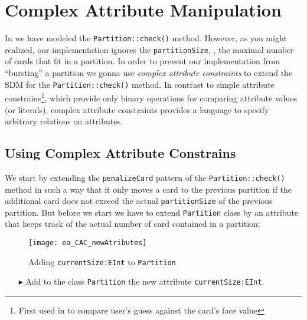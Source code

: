 \newpage
\section{Complex Attribute Manipulation}
\genHeader
In  we have modeled the \texttt{Partition::check()} method.
However, as you might realized, our implementation ignores the \texttt{partitionSize}, \idest, the maximal number of cards that fit in a partition.
In order to prevent our implementation from \enquote{bursting} a partition we gonna use \emph{complex attribute constraints} to extend the SDM for the \texttt{Partition::check()} method. 
In contrast to simple attribute constrains\footnote{First used in  to compare user’s guess against the card's face value}, which provide only binary operations for comparing attribute values (or literals), complex attribute constraints provides a language to specify arbitrary relations on attributes.

\subsection{Using Complex Attribute Constrains}     
We start by extending the \texttt{penalizeCard} pattern of the \texttt{Partition::check()} method in such a way that it only moves a card to the previous partition if the additional card does not exceed the actual \texttt{partitionSize} of the previous partition. But before we start we have to extend \texttt{Partition} class by an attribute that keeps track of the actual number of card contained in a partition:

\begin{figure}[htbp]
\begin{center}
  \texttt{[image: ea\_CAC\_newAtributes]}
  \caption{Adding \texttt{currentSize:EInt} to \texttt{Partition}}  
  \label{ea_CAC_newAtributes}
\end{center}
\end{figure}

\begin{itemize}    
\item[$\blacktriangleright$] Add to the class \texttt{Partition} the new attribute \texttt{currentSize:EInt}.
\end{itemize} 


